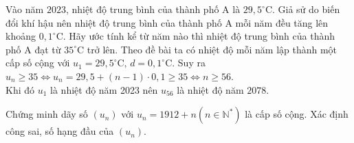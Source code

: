 \begin{bt}%
    Vào năm $2023$, nhiệt độ trung bình của thành phố $\mathrm{A}$ là $29{,}5^{\circ} \mathrm{C}$. Giả sử do biến đổi khí hậu nên nhiệt độ trung bình của thành phố $\mathrm{A}$ mỗi năm đều tăng lên khoảng $0{,}1^{\circ} \mathrm{C}$. Hãy ước tính kể từ năm nào thì nhiệt độ trung bình của thành phố $\mathrm{A}$ đạt từ $35^{\circ} \mathrm{C}$ trở lên.
    \loigiai
    { Theo đề bài ta có nhiệt độ mỗi năm lập thành một cấp số cộng với  $u_1=29{,}5^\circ \mathrm{C},\, d=0{,}1^\circ \mathrm{C}$.
        Suy ra
        $u_n \geq 35 \Leftrightarrow u_n=29{,}5+(n-1) \cdot 0{,}1 \geq 35
        \Leftrightarrow n \geq 56$.\\
        Khi đó $u_1$ là nhiệt độ năm 2023 nên $u_{56}$ là nhiệt độ năm $2078$.
    }
\end{bt}

\begin{bt}%
Chứng minh dãy số $\left(u_n\right)$ với $u_n=1912+n\left(n \in \mathbb{N}^*\right)$ là cấp số cộng. Xác định công sai, số hạng đầu của $\left(u_n\right)$.

\end{bt}

